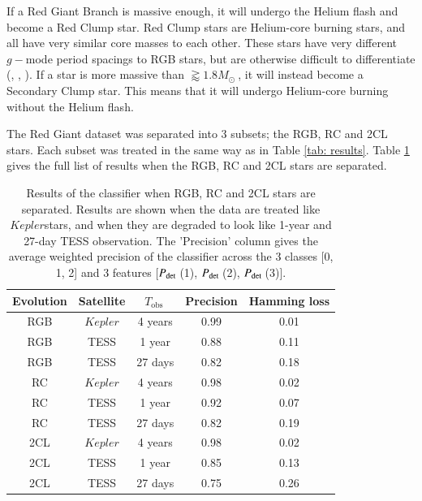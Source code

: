 \documentclass[a4paper,fleqn,usenatbib,useAMS]{mnras}
\newcommand{\kep}{\ensuremath{Kepler}\:}
\newcommand{\pdet}{\ensuremath{P_{\rm det}\:}}
\newcommand{\tobs}{\ensuremath{T_{\textrm{obs}}\:}}
\newcommand{\msol}{\ensuremath{M_{\odot}\:}}
\begin{document}
If a Red Giant Branch is massive enough, it will undergo the Helium flash and become a Red Clump star. Red Clump stars are Helium-core burning stars, and all have very similar core masses to each other. These stars have very different $g-$mode period spacings to RGB stars, but are otherwise difficult to differentiate (\citet{chaplin_asteroseismology_2013}, \citet{bedding_solar-like_2011}, \citet{beck_kepler_2011}). If a star is more massive than $\gtrapprox1.8\msol$, it will instead become a Secondary Clump star. This means that it will undergo Helium-core burning without the Helium flash.

The Red Giant dataset was separated into 3 subsets; the RGB, RC and 2CL stars. Each subset was treated in the same way as in Table \ref{tab: results}. Table \ref{tab: evo results} gives the full list of results when the RGB, RC and 2CL stars are separated. 
\begin{table}
\begin{center}
\begin{tabular}{ |c|c|c|c|c| }
Evolution & Satellite & \tobs   & Precision & Hamming loss \\
\hline
RGB       & \kep      & 4 years & 0.99      & 0.01         \\
RGB       & TESS      & 1 year  & 0.88      & 0.11         \\
RGB       & TESS      & 27 days & 0.82      & 0.18         \\
\hline
RC        & \kep      & 4 years & 0.98      & 0.02         \\
RC        & TESS      & 1 year  & 0.92      & 0.07         \\
RC        & TESS      & 27 days & 0.82      & 0.19         \\
\hline
2CL       & \kep      & 4 years & 0.98      & 0.02         \\
2CL       & TESS      & 1 year  & 0.85      & 0.13         \\
2CL       & TESS      & 27 days & 0.75      & 0.26         \\
\end{tabular}
\end{center}
\caption{Results of the classifier when RGB, RC and 2CL stars are separated. Results are shown when the data are treated like \kep stars, and when they are degraded to look like 1-year and 27-day TESS observation. The 'Precision' column gives the average weighted precision of the classifier across the 3 classes [0, 1, 2] and 3 features [\pdet(1), \pdet(2), \pdet(3)].}
\label{tab: evo results}
\end{table}
\end{document}
